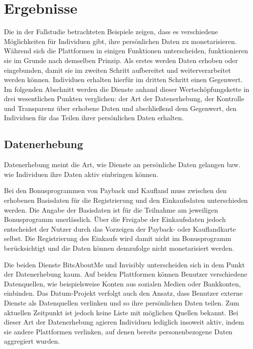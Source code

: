 \section{Ergebnisse}
Die in der Fallstudie betrachteten Beispiele zeigen, dass es verschiedene Möglichkeiten für Individuen gibt, ihre persönlichen Daten zu monetarisieren. Während sich die Plattformen in einigen Funktionen unterscheiden, funktionieren sie im Grunde nach demselben Prinzip. Als erstes werden Daten erhoben oder eingebunden, damit sie im zweiten Schritt aufbereitet und weiterverarbeitet werden können. Individuen erhalten hierfür im dritten Schritt einen Gegenwert. Im folgenden Abschnitt werden die Dienste anhand dieser Wertschöpfungskette in drei wesentlichen Punkten verglichen: der Art der Datenerhebung, der Kontrolle und Transparenz über erhobene Daten und abschließend dem Gegenwert, den Individuen für das Teilen ihrer persönlichen Daten erhalten.

\subsection{Datenerhebung}
Datenerhebung meint die Art, wie Dienste an persönliche Daten gelangen bzw. wie Individuen ihre Daten aktiv einbringen können. \newline

\noindent Bei den Bonusprogrammen von Payback und Kaufland muss zwischen den erhobenen Basisdaten für die Registrierung und den Einkaufsdaten unterschieden werden. Die Angabe der Basisdaten ist für die Teilnahme am jeweiligen Bonusprogramm unerlässlich. Über die Freigabe der Einkaufsdaten jedoch entscheidet der Nutzer durch das Vorzeigen der Payback- oder Kauflandkarte selbst. Die Registrierung des Einkaufs wird damit nicht im Bonusprogramm berücksichtigt und die Daten können demzufolge nicht monetarisiert werden. \newline

\noindent Die beiden Dienste BitsAboutMe und Invisibly unterscheiden sich in dem Punkt der Datenerhebung kaum. Auf beiden Plattformen können Benutzer verschiedene Datenquellen, wie beispielsweise Konten aus sozialen Medien oder Bankkonten, einbinden. Das Datum-Projekt verfolgt auch den Ansatz, dass Benutzer externe Dienste als Datenquellen verlinken und so ihre persönlichen Daten teilen. Zum aktuellen Zeitpunkt ist jedoch keine Liste mit möglichen Quellen bekannt. Bei dieser Art der Datenerhebung agieren Individuen lediglich insoweit aktiv, indem sie andere Plattformen verlinken, auf denen bereits personenbezogene Daten aggregiert wurden. \newline

